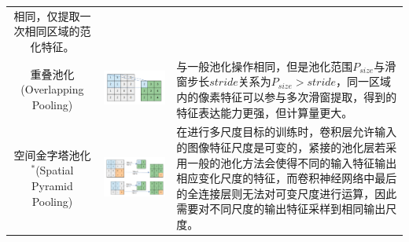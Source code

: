 \begin{longtable}[]{@{}ccl@{}}
\begin{minipage}[t]{0.36\columnwidth}
相同，仅提取一次相同区域的范化特征。\strut
\end{minipage}\tabularnewline
\begin{minipage}[t]{0.26\columnwidth}\centering\strut
重叠池化(Overlapping Pooling)\strut
\end{minipage} & \begin{minipage}[t]{0.29\columnwidth}\centering\strut
\includegraphics{./img/ch5/overlap_pooling.png}\strut
\end{minipage} & \begin{minipage}[t]{0.36\columnwidth}\raggedright\strut
与一般池化操作相同，但是池化范围\(P_{size}\)与滑窗步长\(stride\)关系为\(P_{size}>stride\)，同一区域内的像素特征可以参与多次滑窗提取，得到的特征表达能力更强，但计算量更大。\strut
\end{minipage}\tabularnewline
\begin{minipage}[t]{0.26\columnwidth}\centering\strut
空间金字塔池化\(^*\)(Spatial Pyramid Pooling)\strut
\end{minipage} & \begin{minipage}[t]{0.29\columnwidth}\centering\strut
\includegraphics{./img/ch5/spatial_pooling.png}\strut
\end{minipage} & \begin{minipage}[t]{0.36\columnwidth}\raggedright\strut
在进行多尺度目标的训练时，卷积层允许输入的图像特征尺度是可变的，紧接的池化层若采用一般的池化方法会使得不同的输入特征输出相应变化尺度的特征，而卷积神经网络中最后的全连接层则无法对可变尺度进行运算，因此需要对不同尺度的输出特征采样到相同输出尺度。\strut
\end{minipage}\tabularnewline
\bottomrule
\end{longtable}

